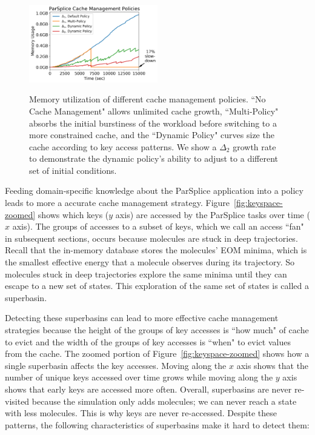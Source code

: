 \begin{figure}[t]
\noindent\includegraphics[width=0.5\textwidth]{figures/memory-vs-time.png}\\

\caption{Memory utilization of different cache management policies.  ``No Cache
Management" allows unlimited cache growth, ``Multi-Policy" absorbs the initial
burstiness of the workload before switching to a more constrained cache, and
the ``Dynamic Policy" curves size the cache according to key access patterns.
We show a \(\Delta_2\) growth rate to demonstrate the dynamic policy's ability
to adjust to a different set of initial conditions.\label{fig:memory-vs-time}}
\end{figure}




Feeding domain-specific knowledge about the ParSplice application into a policy
leads to more a accurate cache management strategy.
Figure~\ref{fig:keyspace-zoomed} shows which keys (\(y\) axis) are accessed by
the ParSplice tasks over time (\(x\) axis). The groups of accesses to a subset
of keys, which we call an access ``fan" in subsequent sections, occurs because
molecules are stuck in deep trajectories. Recall that the in-memory database
stores the molecules' EOM minima, which is the smallest effective energy that a
molecule observes during its trajectory. So molecules stuck in deep
trajectories explore the same minima until they can escape to a new set of
states. This exploration of the same set of states is called a superbasin. 

Detecting these superbasins can lead to more effective cache management
strategies because the height of the groups of key accesses is ``how much" of cache
to evict and the width of the groups of key accesses is ``when" to evict values from
the cache.  The zoomed portion of Figure~\ref{fig:keyspace-zoomed} shows how a
single superbasin affects the key accesses. Moving along the \(x\) axis shows
that the number of unique keys accessed over time grows while moving along the
\(y\) axis shows that early keys are accessed more often.  Overall, superbasins
are never re-visited because the simulation only adds molecules; we can never
reach a state with less molecules. This is why keys are never re-accessed.
Despite these patterns, the following characteristics of superbasins make it
hard to detect them:


